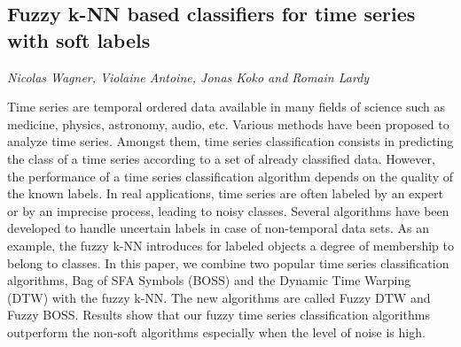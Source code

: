 \documentclass[../booklet.tex]{subfiles}
\begin{document}
\subsection[Fuzzy k-NN based classifiers for time series with soft labels. {\it Nicolas Wagner, Violaine Antoine, Jonas Koko and Romain Lardy}]{Fuzzy k-NN based classifiers for time series with soft labels}
   

\begin{center}
  {\it Nicolas Wagner, Violaine Antoine, Jonas Koko and Romain Lardy}
\end{center}



Time series are temporal ordered data available in many fields of science such as medicine, physics, astronomy, audio, etc. Various methods have been proposed to analyze time series. Amongst them, time series classification consists in predicting the class of a time series according to a set of already classified data. However, the performance of a time series classification algorithm depends on the quality of the known labels.  In real applications, time series are often labeled by an expert or by an imprecise process, leading to noisy classes. Several algorithms have been developed to handle uncertain labels in case of non-temporal data sets. As an example, the fuzzy k-NN introduces for labeled objects a degree of membership to belong to classes. In this paper, we combine two popular time series classification algorithms, Bag of SFA Symbols (BOSS) and the Dynamic Time Warping (DTW) with the fuzzy k-NN. The new algorithms are called Fuzzy DTW and Fuzzy BOSS. Results show that our fuzzy time series classification algorithms outperform the non-soft algorithms especially when the level of noise is high.
\end{document}
